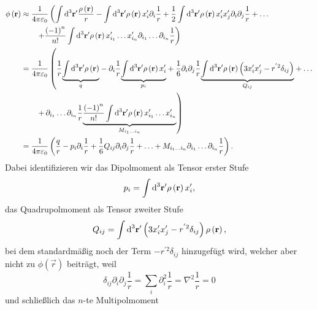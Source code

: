 \begin{align*}
	\phi \left(\mathbf{r}\right)&\approx \frac{1}{4\pi \varepsilon _{0}}\left(\int \text{d} ^{3}\mathbf{r}'\frac{\rho \left(\mathbf{r}\right)}{r}-\int \text{d} ^{3}\mathbf{r}'\rho \left(\mathbf{r}\right)x_{i}'\partial _{i}\frac{1}{r}+\frac{1}{2}\int \text{d} ^{3}\mathbf{r}'\rho \left(\mathbf{r}\right)x_{i}'x_{j}'\partial _{i}\partial _{j}\frac{1}{r}+\ldots \right. \\ &\quad\quad\left. +\frac{\left(-1\right)^{n}}{n!}\int \text{d} ^{3}\mathbf{r}'\rho \left(\mathbf{r}\right)x_{i_{1}}'\ldots  x_{i_{n}}'\partial _{{i_{1}}}\ldots \partial _{{i_{n}}}\frac{1}{r}\right)\\&=\frac{1}{4\pi \varepsilon _{0}}\left(\frac{1}{r}\underset{q}{\underbrace{\int \text{d} ^{3}\mathbf{r}'\rho \left(\mathbf{r}\right)}}-\partial _{i}\frac{1}{r}\underset{p_{i}}{\underbrace{\int \text{d} ^{3}\mathbf{r}'\rho \left(\mathbf{r}\right)x_{i}'}}+\frac{1}{6}\partial _{i}\partial _{j}\frac{1}{r}\underset{Q_{ij}}{\underbrace{\int \text{d} ^{3}\mathbf{r}'\rho \left(\mathbf{r}\right)\left(3x_{i}'x_{j}'-r^{'2}\delta _{ij}\right)}}+\ldots \right. \\ &\quad\quad\left.  +\,\partial _{{i_{1}}}\ldots \partial _{{i_{n}}}\frac{1}{r}\underset{M_{{i_{1}}\ldots {i_{n}}}}{\underbrace{\frac{\left(-1\right)^{n}}{n!}\int \text{d} ^{3}\mathbf{r}'\rho \left(\mathbf{r}\right)x_{i_{1}}'\ldots x_{i_{n}}'}}\right)\\&=\frac{1}{4\pi \varepsilon _{0}}\left(\frac{q}{r}-p_{i}\partial _{i}\frac{1}{r}+\frac{1}{6}Q_{ij}\partial _{i}\partial _{j}\frac{1}{r}+\ldots +M_{{i_{1}}\ldots {i_{n}}}\partial _{{i_{1}}}\ldots \partial _{{i_{n}}}\frac{1}{r}\right).
\end{align*}
Dabei identifizieren wir das Dipolmoment als Tensor erster Stufe
\begin{equation*}
	p_{i}=\int \text{d} ^{3}\mathbf{r}'\rho \left(\mathbf{r}\right)x_{i}',
\end{equation*}
das Quadrupolmoment als Tensor zweiter Stufe
\begin{equation*}
	Q_{ij}=\int \text{d} ^{3}\mathbf{r}'\left(3x_{i}'x_{j}'-r^{'2}\delta _{ij}\right)\rho \left(\mathbf{r}\right),
\end{equation*}
bei dem standardmäßig noch der Term $-r^{'2}\delta _{ij}$ hinzugefügt wird, welcher aber nicht zu $\phi(\vec r) $ beiträgt, weil
\begin{equation*}
	\delta _{ij}\partial _{i}\partial _{j}\frac{1}{r}=\sum _{i}\partial _{i}^{2}\frac{1}{r}=\nabla ^{2}\frac{1}{r}=0
\end{equation*}
und schließlich das $n$-te Multipolmoment
